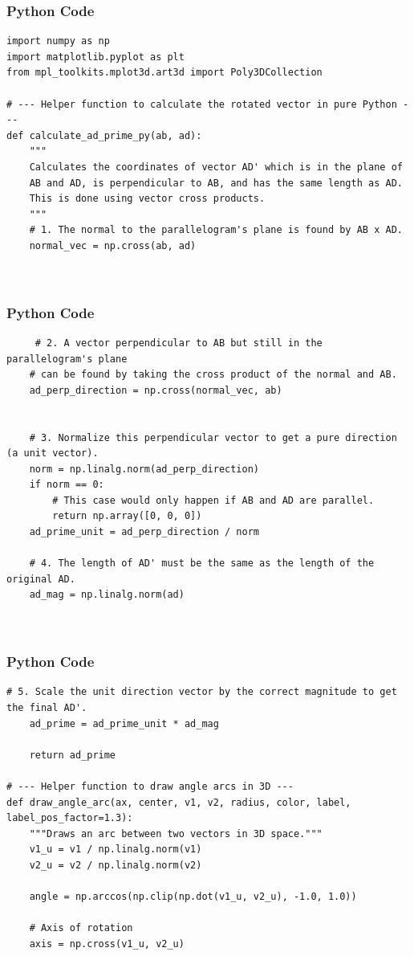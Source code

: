 \documentclass{beamer}
\begin{document}
\begin{frame}[fragile]
    \frametitle{Python Code}
    \begin{lstlisting}
import numpy as np
import matplotlib.pyplot as plt
from mpl_toolkits.mplot3d.art3d import Poly3DCollection

# --- Helper function to calculate the rotated vector in pure Python ---
def calculate_ad_prime_py(ab, ad):
    """
    Calculates the coordinates of vector AD' which is in the plane of
    AB and AD, is perpendicular to AB, and has the same length as AD.
    This is done using vector cross products.
    """
    # 1. The normal to the parallelogram's plane is found by AB x AD.
    normal_vec = np.cross(ab, ad)

   

\end{lstlisting}
\end{frame}

\begin{frame}[fragile]
    \frametitle{Python Code }
    \begin{lstlisting}
     # 2. A vector perpendicular to AB but still in the parallelogram's plane
    # can be found by taking the cross product of the normal and AB.
    ad_perp_direction = np.cross(normal_vec, ab)


    # 3. Normalize this perpendicular vector to get a pure direction (a unit vector).
    norm = np.linalg.norm(ad_perp_direction)
    if norm == 0:
        # This case would only happen if AB and AD are parallel.
        return np.array([0, 0, 0])
    ad_prime_unit = ad_perp_direction / norm
    
    # 4. The length of AD' must be the same as the length of the original AD.
    ad_mag = np.linalg.norm(ad)
    
    
\end{lstlisting}
\end{frame}

\begin{frame}[fragile]
    \frametitle{Python Code }
    \begin{lstlisting}
# 5. Scale the unit direction vector by the correct magnitude to get the final AD'.
    ad_prime = ad_prime_unit * ad_mag
    
    return ad_prime

# --- Helper function to draw angle arcs in 3D ---
def draw_angle_arc(ax, center, v1, v2, radius, color, label, label_pos_factor=1.3):
    """Draws an arc between two vectors in 3D space."""
    v1_u = v1 / np.linalg.norm(v1)
    v2_u = v2 / np.linalg.norm(v2)
    
    angle = np.arccos(np.clip(np.dot(v1_u, v2_u), -1.0, 1.0))
    
    # Axis of rotation
    axis = np.cross(v1_u, v2_u)
    
    

\end{lstlisting}
\end{frame}
\end{document}
